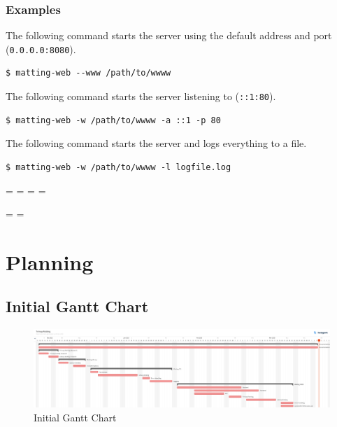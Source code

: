 \documentclass[a4paper]{article}
\begin{document}
\subsubsection{Examples}

The following command starts the server using the default
address and port (\texttt{0.0.0.0:8080}).
\begin{lstlisting}[style=boxed]
    $ matting-web --www /path/to/wwww
\end{lstlisting}

The following command starts the server listening to
(\texttt{::1:80}).
\begin{lstlisting}[style=boxed]
    $ matting-web -w /path/to/wwww -a ::1 -p 80
\end{lstlisting}

The following command starts the server and logs everything to a file.
\begin{lstlisting}[style=boxed]
    $ matting-web -w /path/to/wwww -l logfile.log
\end{lstlisting}

\newlength{\mtL}

\setlength{\mtL}{.8\paperheight}%

\addtolength\mtL{-\headwidth}
\newpage
\addtolength\headwidth{\mtL}


\pdfpageheight=\paperwidth
\pdfpagewidth=\paperheight
\paperwidth=\pdfpagewidth
\paperheight=\pdfpageheight

\begingroup
{}\pdfpageheight %
\pdfpageheight
\textwidth=\hsize
\textwidth=\vsize


\section{Planning}

\subsection{Initial Gantt Chart}

\begin{figure}[h]
    \includegraphics[width=\textwidth]{gantt/gantt1.jpg}
    \caption{Initial Gantt Chart}
\end{figure}
\end{document}
